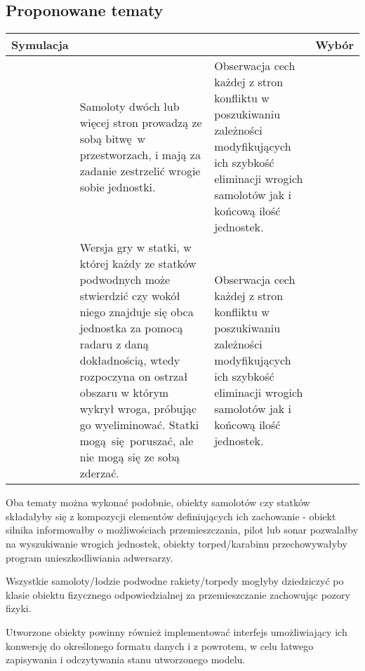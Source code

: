 \documentclass{article}
\begin{document}
\subsection{Proponowane tematy}
\begin{adjustbox}{center}
	\begin{tabular}[h]{
			>{\centering\arraybackslash}c
			p{}
			p{}
			>{\centering\arraybackslash}c
		}
			Symulacja & \centering{Opis} & \centering{Cel} & Wybór \\
			\hline \centering{Bitwa samolotowa} & { 
				Samoloty dwóch lub więcej stron prowadzą ze sobą
				bitwę w przestworzach, i mają za zadanie zestrzelić
				wrogie sobie jednostki.
			} & { 
				Obserwacja cech każdej z stron konfliktu w poszukiwaniu
				zależności modyfikujących ich szybkość eliminacji wrogich
				samolotów jak i końcową ilość jednostek.
			}&  \\
			\hline \centering{Statki} & { 
				Wersja gry w statki, w której każdy ze statków podwodnych może stwierdzić
				czy wokół niego znajduje się obca jednostka za pomocą radaru z daną dokładnością,
				wtedy rozpoczyna on ostrzał obszaru w którym wykrył wroga,
				próbując go wyeliminować. Statki mogą się poruszać, ale nie mogą się
				ze sobą zderzać.
			} & { 
				Obserwacja cech każdej z stron konfliktu w poszukiwaniu
				zależności modyfikujących ich szybkość eliminacji wrogich
				samolotów jak i końcową ilość jednostek.
			}&  \\
		\end{tabular}
\end{adjustbox}

Oba tematy można wykonać podobnie, obiekty samolotów czy statków składałyby się z kompozycji
elementów definiujących ich zachowanie - obiekt silnika informowałby o możliwościach
przemieszczania, pilot lub sonar pozwalałby na wyszukiwanie wrogich jednostek, obiekty
torped/karabinu przechowywałyby program unieszkodliwiania adwersarzy.

Wszystkie samoloty/łodzie podwodne rakiety/torpedy mogłyby dziedziczyć po klasie obiektu fizycznego
odpowiedzialnej za przemieszczanie zachowując pozory fizyki.

Utworzone obiekty powinny również implementować interfejs umożliwiający ich konwersję do
określonego formatu danych i z powrotem, w celu łatwego zapisywania i odczytywania stanu utworzonego
modelu.
\end{document}
